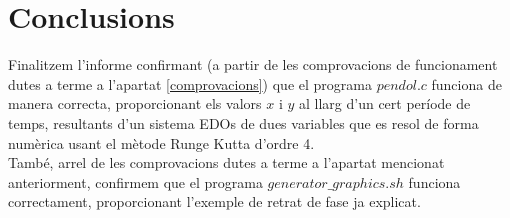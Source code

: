 \documentclass[a4paper, 11pt]{article}
\begin{document}
\section{Conclusions}
Finalitzem l'informe confirmant (a partir de les comprovacions de funcionament dutes a terme a l'apartat \textcolor{blue}{\ref{comprovacions}}) que el programa $pendol.c$ funciona de manera correcta, proporcionant els valors $x$ i $y$ al llarg d'un cert període de temps, resultants d'un sistema EDOs de dues variables que es resol de forma numèrica usant el mètode Runge Kutta d'ordre 4.\\
També, arrel de les comprovacions dutes a terme a l'apartat mencionat anteriorment, confirmem que el programa $generator\_graphics.sh$ funciona correctament, proporcionant l'exemple de retrat de fase ja explicat.\\
\end{document}
